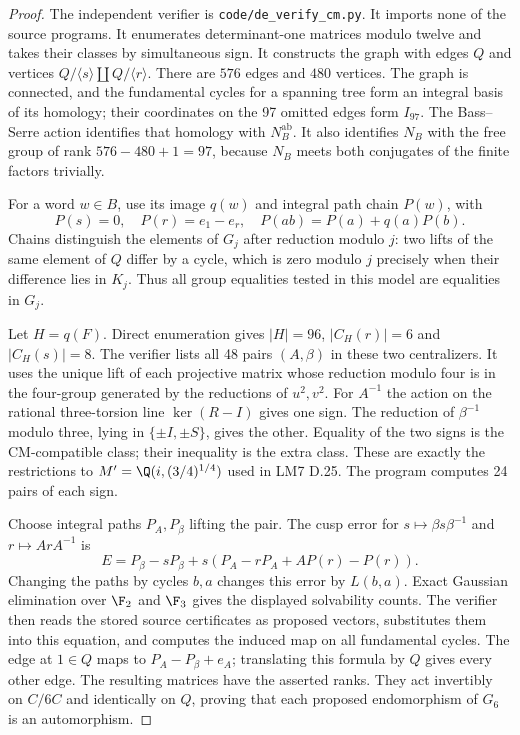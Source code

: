 \begin{proof}
The independent verifier is \texttt{code/de\_verify\_cm.py}.
It imports none of the source programs. It enumerates determinant-one
matrices modulo twelve and takes their classes by simultaneous sign.
It constructs the graph with edges $Q$ and vertices
$Q/\langle s\rangle\amalg Q/\langle r\rangle$. There are $576$
edges and $480$ vertices. The graph is connected, and the fundamental
cycles for a spanning tree form an integral basis of its homology;
their coordinates on the 97 omitted edges form $I_{97}$.
The Bass--Serre action identifies that homology with $N_B^{\mathrm{ab}}$.
It also identifies $N_B$ with the free group of rank $576-480+1=97$,
because $N_B$ meets both conjugates of the finite factors trivially.

For a word $w\in B$, use its image $q(w)$ and integral path chain
$P(w)$, with
\[
 P(s)=0,\quad P(r)=e_1-e_r,\quad
 P(ab)=P(a)+q(a)P(b).
\]
Chains distinguish the elements of $G_j$ after reduction modulo $j$:
two lifts of the same element of $Q$ differ by a cycle, which is zero
modulo $j$ precisely when their difference lies in $K_j$. Thus all
group equalities tested in this model are equalities in $G_j$.

Let $H=q(F)$. Direct enumeration gives $|H|=96$,
$|C_H(r)|=6$ and $|C_H(s)|=8$.
The verifier lists all 48 pairs $(A,\beta)$ in these two centralizers.
It uses the unique lift of each projective matrix whose reduction
modulo four is in the four-group generated by the reductions of
$u^2,v^2$. For $A^{-1}$ the action on the rational three-torsion line
$\ker(R-I)$ gives one sign. The reduction of $\beta^{-1}$ modulo
three, lying in $\{\pm I,\pm S\}$, gives the other. Equality of the
two signs is the CM-compatible class; their inequality is the extra
class. These are exactly the restrictions to
$M'=\Q(i,(3/4)^{1/4})$ used in LM7 D.25. The program computes
24 pairs of each sign.

Choose integral paths $P_A,P_\beta$ lifting the pair. The cusp error
for $s\mapsto\beta s\beta^{-1}$ and $r\mapsto ArA^{-1}$ is
\[
 E=P_\beta-sP_\beta+
       s(P_A-rP_A+A P(r)-P(r)).
\]
Changing the paths by cycles $b,a$ changes this error by $L(b,a)$.
Exact Gaussian elimination over $\F_2$ and $\F_3$ gives the displayed
solvability counts. The verifier then reads the stored source
certificates as proposed vectors, substitutes them into this equation,
and computes the induced map on all fundamental cycles. The edge at
$1\in Q$ maps to
$P_A-P_\beta+e_A$; translating this formula by $Q$ gives every other
edge. The resulting matrices have the asserted ranks. They act
invertibly on $C/6C$ and identically on $Q$, proving that each proposed
endomorphism of $G_6$ is an automorphism.


\end{proof}
